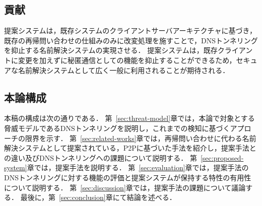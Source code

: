 \subsection{貢献}
提案システムは，既存システムのクライアントサーバアーキテクチャに基づき，既存の再帰問い合わせの仕組みのみに改変処理を施すことで，DNSトンネリングを抑止する名前解決システムの実現させる．
提案システムは，既存クライアントに変更を加えずに秘匿通信としての機能を抑止することができるため，セキュアな名前解決システムとして広く一般に利用されることが期待される．


\subsection{本論構成}
本稿の構成は次の通りである．
第~\ref{sec:threat-model}章では，本論で対象とする脅威モデルであるDNSトンネリングを説明し，これまでの検知に基づくアプローチの限界を示す．
第~\ref{sec:related-works}章では，再帰問い合わせに代わる名前解決システムとして提案されている，P2Pに基づいた手法を紹介し，提案手法との違い及びDNSトンネリングへの課題について説明する．
第~\ref{sec:proposed-system}章では，提案手法を説明する．
第~\ref{sec:evaluation}章では，提案手法のDNSトンネリングに対する機能の評価と提案システムが保持する特性の有用性について説明する．
第~\ref{sec:discussion}章では，提案手法の課題について議論する．
最後に，第~\ref{sec:conclusion}章にて結論を述べる．
